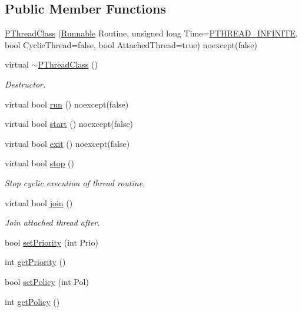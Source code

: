 \subsection*{Public Member Functions}
\begin{DoxyCompactItemize}
\item 
\hyperlink{classPThreadClass_ac0e02c9a05d995e4980837c1491d85e9}{P\+Thread\+Class} (\hyperlink{structRunnable}{Runnable} Routine, unsigned long Time=\hyperlink{PThreadClassLib_8h_a9d2d74d73cb5d069fbfcbcfebf42bd6e}{P\+T\+H\+R\+E\+A\+D\+\_\+\+I\+N\+F\+I\+N\+I\+TE}, bool Cyclic\+Thread=false, bool Attached\+Thread=true) noexcept(false)
\item 
virtual \hyperlink{classPThreadClass_acd1859c3acc32abc90f677578eeb6749}{$\sim$\+P\+Thread\+Class} ()
\begin{DoxyCompactList}\small\item\em Destructor. \end{DoxyCompactList}\item 
virtual bool \hyperlink{classPThreadClass_a9e60b014b8e8ba6892cc322b6ba183d8}{run} () noexcept(false)
\item 
virtual bool \hyperlink{classPThreadClass_a94862a3179469348fd89aefe9dac8244}{start} () noexcept(false)
\item 
virtual bool \hyperlink{classPThreadClass_a699d636eda769173287c18bd1a5f4a77}{exit} () noexcept(false)
\item 
virtual bool \hyperlink{classPThreadClass_a71e308a0324c76e20c504c037a3e7652}{stop} ()
\begin{DoxyCompactList}\small\item\em Stop cyclic execution of thread routine. \end{DoxyCompactList}\item 
virtual bool \hyperlink{classPThreadClass_afe4c0ea5bd3e1c89e01499bbca5e194d}{join} ()
\begin{DoxyCompactList}\small\item\em Join attached thread after. \end{DoxyCompactList}\item 
bool \hyperlink{classPThreadClass_a8d6247e87165abb43186f1a03261f175}{set\+Priority} (int Prio)
\item 
int \hyperlink{classPThreadClass_aca9cc33ac2e0d2f25e1fa993c78e68cc}{get\+Priority} ()
\item 
bool \hyperlink{classPThreadClass_a9fd180b8c007384057618c2c5111e834}{set\+Policy} (int Pol)
\item 
int \hyperlink{classPThreadClass_a8a77ce45b960ad25c2bbdcc4ba8341b6}{get\+Policy} ()

\end{DoxyCompactItemize}
